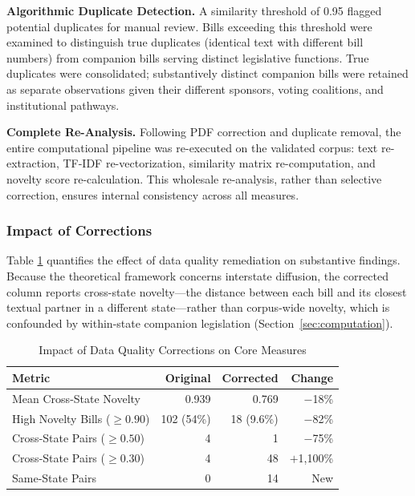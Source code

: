 \textbf{Algorithmic Duplicate Detection.} A similarity threshold of 0.95 flagged potential duplicates for manual review. Bills exceeding this threshold were examined to distinguish true duplicates (identical text with different bill numbers) from companion bills serving distinct legislative functions. True duplicates were consolidated; substantively distinct companion bills were retained as separate observations given their different sponsors, voting coalitions, and institutional pathways.

\textbf{Complete Re-Analysis.} Following PDF correction and duplicate removal, the entire computational pipeline was re-executed on the validated corpus: text re-extraction, TF-IDF re-vectorization, similarity matrix re-computation, and novelty score re-calculation. This wholesale re-analysis, rather than selective correction, ensures internal consistency across all measures.

\subsubsection{Impact of Corrections}

Table \ref{tab:correction_impact} quantifies the effect of data quality remediation on substantive findings.
Because the theoretical framework concerns interstate diffusion, the corrected column reports cross-state novelty---the distance between each bill and its closest textual partner in a different state---rather than corpus-wide novelty, which is confounded by within-state companion legislation (Section~\ref{sec:computation}).
\begin{table}[h]
    \centering
    \caption{Impact of Data Quality Corrections on Core Measures}
    \label{tab:correction_impact}
    \begin{tabular}{lrrr}
    \toprule
    \textbf{Metric} & \textbf{Original} & \textbf{Corrected} & \textbf{Change} \\
    \midrule
   Mean Cross-State Novelty & 0.939 & 0.769 & $-$18\% \\
   High Novelty Bills ($\geq0.90$) & 102 (54\%) & 18 (9.6\%) & $-$82\% \\
   Cross-State Pairs ($\geq0.50$) & 4 & 1 & $-$75\% \\
   Cross-State Pairs ($\geq0.30$) & 4 & 48 & $+$1,100\% \\
   Same-State Pairs & 0 & 14 & New \\
   \bottomrule
    \end{tabular}
\end{table}

